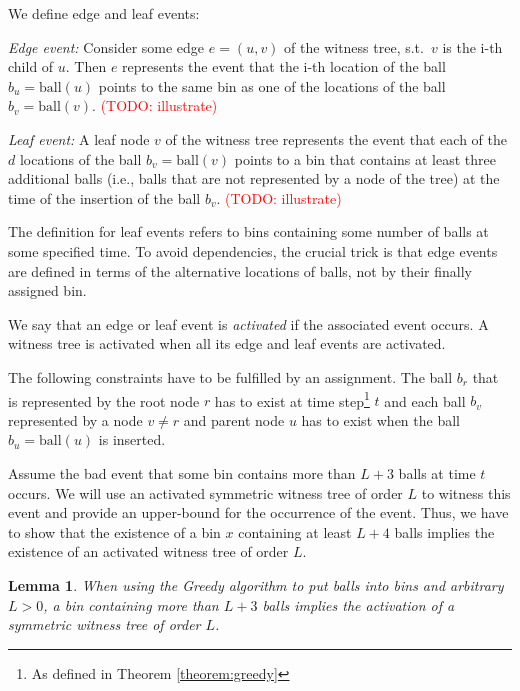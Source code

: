 \documentclass[a4paper,12pt]{article}
\newcommand\todo[1]{\textcolor{red}{(TODO: #1)}}
\newtheorem{lemma}{Lemma}
\begin{document}
We define edge and leaf events:
\begin{compactitem}
\item \emph{Edge event:} Consider some edge $e = (u,v)$ of the witness tree, s.t.~$v$ is the i-th child of $u$. Then $e$ represents the event that the i-th location of the ball $b_u = \mathrm{ball}(u)$ points to the same bin as one of the locations of the ball $b_v = \mathrm{ball}(v)$. 
\todo{illustrate}
\item \emph{Leaf event:} A leaf node $v$ of the witness tree represents the event that each of the $d$ locations of the ball $b_v = \mathrm{ball}(v)$ points to a bin that contains at least three additional balls (i.e., balls that are not represented by a node of the tree) at the time of the insertion of the ball $b_v$.
\todo{illustrate}
\end{compactitem}
The definition for leaf events refers to bins containing some number of balls at some specified time. To avoid dependencies, the crucial trick is that edge events are defined in terms of the alternative locations of balls, not by their finally assigned bin. 

We say that an edge or leaf event is \emph{activated} if the associated event occurs. A witness tree is activated when all its edge and leaf events are activated. 

The following constraints have to be fulfilled by an assignment. The ball $b_r$ that is represented by the root node $r$ has to exist at time step\footnote{As defined in Theorem \ref{theorem:greedy}} $t$ and each ball $b_v$ represented by a node $v \neq r$ and parent node $u$ has to exist when the ball $b_u = \mathrm{ball}(u)$ is inserted.

Assume the bad event that some bin contains more than $L+3$ balls at time $t$ occurs. We will use an activated symmetric witness tree of order $L$ to witness this event and provide an upper-bound for the occurrence of the event. Thus, we have to show that the existence of a bin $x$ containing at least $L+4$ balls implies the existence of an activated witness tree of order $L$. 

\begin{lemma}
When using the Greedy algorithm to put balls into bins and arbitrary $L > 0$, a bin containing more than $L+3$ balls implies the activation of a symmetric witness tree of order $L$.
\end{lemma}
\end{document}

